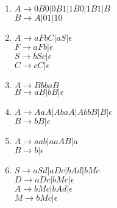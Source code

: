 \begin{enumerate}
\begin{enumerate}
        \item $A \to 0B0 | 0B1 | 1B0 | 1B1 | B$ \\ $B \to A | 01 | 10$

        \item $A \to aFbC | aS | \epsilon$ \\ $F \to aFb | \epsilon$ \\ $S \to bSc | \epsilon$ \\ $C \to cC | \epsilon$

        \item $A \to BbbaB$ \\ $B \to aB | bB | \epsilon$

        \item $A \to AaA | AbaA | AbbB | B | \epsilon$ \\ $B \to bB | \epsilon$

        \item $A \to aab | aaAB | a$ \\ $B \to b | \epsilon$

        \item $S \to aSd | aDc | bAd | bMc$ \\ $D \to aDc | bMc | \epsilon$ \\ $A \to bMc | bAd | \epsilon$ \\ $M \to bMc | \epsilon$
    \end{enumerate}


\end{enumerate}
